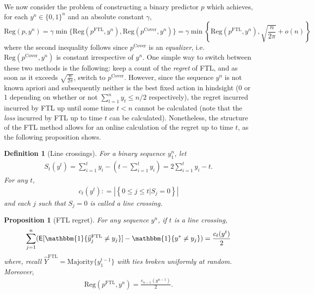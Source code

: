 \documentclass[11pt,letter]{article}
\newtheorem{definition}{Definition}
\newtheorem{proposition}{Proposition}
\newcommand{\defeq}{\mathrel{\mathop{:}}=}
\newcommand{\indi}{\mathbbm{1}}
\newcommand{\g}{\gamma}
\newcommand{\Reg}{\mathrm{Reg}}
\newcommand{\pcov}{p^{\mathrm{Cover}}}
\newcommand{\pftl}{p^{\mathrm{FTL}}}
\newcommand{\yftl}{\widehat{Y}^{\mathrm{FTL}}}
\newcommand{\maj}{\mathrm{Majority}}
\DeclareMathOperator\E{\textsf{E}}
\begin{document}
We now consider the problem of constructing a binary predictor $p$ which achieves, for each $y^n \in \{0,1\}^n$ and an absolute constant $\g$,
\[
\Reg(p,y^n) = \g \min\{\Reg(\pftl, y^n), \Reg(\pcov, y^n)\} = \g \min\left\{\Reg(\pftl, y^n), \sqrt{\frac{n}{2\pi}} + o(n)\right\}
\]
where the second inequality follows since $\pcov$ is an \emph{equalizer}, i.e. $\Reg(\pcov,y^n)$ is constant irrespective of $y^n$. One simple way to switch between these two methods is the following: keep a count of the \emph{regret} of FTL, and as soon as it exceeds $\sqrt{\frac{n}{2\pi}}$, switch to $\pcov$. However, since the sequence $y^n$ is not known apriori and subsequently neither is the best fixed action in hindsight (0 or 1 depending on whether or not $\sum_{t=1}^n y_t \le n/2$ respectively), the regret incurred incurred by FTL up until some time $t < n$ cannot be calculated (note that the \emph{loss} incurred by FTL up to time $t$ can be calculated). Nonetheless, the structure of the FTL method allows for an online calculation of the regret up to time $t$, as the following proposition shows. 
\begin{definition}[Line crossings]\label{defn:StateLineCross}
    For a binary sequence $y_1^n$, let 
    \begin{align}\label{eq:StateDefn} 
        S_t(y^t) = \sum_{i=1}^t y_i - (t-\sum_{i=1}^t y_i) = 2\sum_{i=1}^t y_i - t.
    \end{align}
 For any $t$, 
 \begin{align}\label{eq:NumCrossingsDefn}
     c_t(y^t) \defeq \left|\left\{0 \le j \le t | S_j = 0\right\}\right|
 \end{align}
 and each $j$ such that $S_j = 0$ is called a line crossing. 
\end{definition}
\begin{proposition}[FTL regret] \label{prop:FTLReg}
   For any sequence $y^n$, if $t$ is a line crossing,
   \begin{align}\label{eq:FTLRegAtCrossing}
        \sum_{j=1}^n (\E[\indi\{\widehat{y}^{\mathrm{FTL}}_j \neq y_j\}] - \indi\{y^* \neq y_j\}) = \frac{c_t(y^{t})}{2}
   \end{align}
where, recall $\yftl = \maj\{y_1^{t-1}\}$ with ties broken uniformly at random. Moreover,
\begin{align}\label{eq:FTLRegN}
    \Reg(\pftl, y^n) = \frac{c_{n-1}(y^{n-1})}{2}.
\end{align}
\end{proposition}
\end{document}
